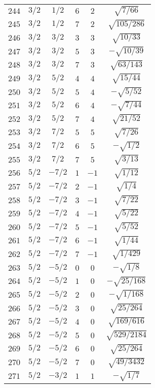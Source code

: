 \begin{table}
\begin{center}
\begin{tabular}{|c|c|c|c|c|c|}
$244$ & $3/2$ & $1/2$ & $6$ & $2$ & $\sqrt{7/66}$ \\ 
$245$ & $3/2$ & $1/2$ & $7$ & $2$ & $\sqrt{105/286}$ \\ 
$246$ & $3/2$ & $3/2$ & $3$ & $3$ & $\sqrt{10/33}$ \\ 
$247$ & $3/2$ & $3/2$ & $5$ & $3$ & $-\sqrt{10/39}$ \\ 
$248$ & $3/2$ & $3/2$ & $7$ & $3$ & $\sqrt{63/143}$ \\ 
$249$ & $3/2$ & $5/2$ & $4$ & $4$ & $\sqrt{15/44}$ \\ 
$250$ & $3/2$ & $5/2$ & $5$ & $4$ & $-\sqrt{5/52}$ \\ 
$251$ & $3/2$ & $5/2$ & $6$ & $4$ & $-\sqrt{7/44}$ \\ 
$252$ & $3/2$ & $5/2$ & $7$ & $4$ & $\sqrt{21/52}$ \\ 
$253$ & $3/2$ & $7/2$ & $5$ & $5$ & $\sqrt{7/26}$ \\ 
$254$ & $3/2$ & $7/2$ & $6$ & $5$ & $-\sqrt{1/2}$ \\ 
$255$ & $3/2$ & $7/2$ & $7$ & $5$ & $\sqrt{3/13}$ \\ 
$256$ & $5/2$ & $-7/2$ & $1$ & $-1$ & $\sqrt{1/12}$ \\ 
$257$ & $5/2$ & $-7/2$ & $2$ & $-1$ & $\sqrt{1/4}$ \\ 
$258$ & $5/2$ & $-7/2$ & $3$ & $-1$ & $\sqrt{7/22}$ \\ 
$259$ & $5/2$ & $-7/2$ & $4$ & $-1$ & $\sqrt{5/22}$ \\ 
$260$ & $5/2$ & $-7/2$ & $5$ & $-1$ & $\sqrt{5/52}$ \\ 
$261$ & $5/2$ & $-7/2$ & $6$ & $-1$ & $\sqrt{1/44}$ \\ 
$262$ & $5/2$ & $-7/2$ & $7$ & $-1$ & $\sqrt{1/429}$ \\ 
$263$ & $5/2$ & $-5/2$ & $0$ & $0$ & $-\sqrt{1/8}$ \\ 
$264$ & $5/2$ & $-5/2$ & $1$ & $0$ & $-\sqrt{25/168}$ \\ 
$265$ & $5/2$ & $-5/2$ & $2$ & $0$ & $-\sqrt{1/168}$ \\ 
$266$ & $5/2$ & $-5/2$ & $3$ & $0$ & $\sqrt{25/264}$ \\ 
$267$ & $5/2$ & $-5/2$ & $4$ & $0$ & $\sqrt{169/616}$ \\ 
$268$ & $5/2$ & $-5/2$ & $5$ & $0$ & $\sqrt{529/2184}$ \\ 
$269$ & $5/2$ & $-5/2$ & $6$ & $0$ & $\sqrt{25/264}$ \\ 
$270$ & $5/2$ & $-5/2$ & $7$ & $0$ & $\sqrt{49/3432}$ \\ 
$271$ & $5/2$ & $-3/2$ & $1$ & $1$ & $-\sqrt{1/7}$ \\ 

\end{tabular}
\end{center}
\end{table}
